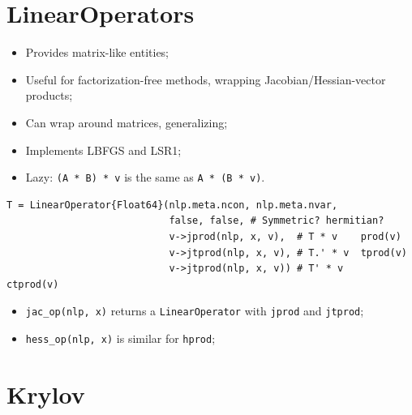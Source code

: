 \section{LinearOperators}

\begin{frame}[fragile,t]
  \begin{itemize}
    \item Provides matrix-like entities;
    \item Useful for factorization-free methods, wrapping Jacobian/Hessian-vector
      products;
    \item Can wrap around matrices, generalizing;
    \item Implements LBFGS and LSR1;
    \item Lazy: \verb+(A * B) * v+ is the same as \verb+A * (B * v)+.
  \end{itemize}
\begin{lstlisting}
T = LinearOperator{Float64}(nlp.meta.ncon, nlp.meta.nvar,
                            false, false, # Symmetric? hermitian?
                            v->jprod(nlp, x, v),  # T * v    prod(v)
                            v->jtprod(nlp, x, v), # T.' * v  tprod(v)
                            v->jtprod(nlp, x, v)) # T' * v    ctprod(v)
\end{lstlisting}
\end{frame}

\begin{frame}[fragile,t]
  \begin{itemize}
    \item \verb+jac_op(nlp, x)+ returns a \verb+LinearOperator+ with \verb+jprod+ and
      \verb+jtprod+;
    \item \verb+hess_op(nlp, x)+ is similar for \verb+hprod+;
  \end{itemize}
\end{frame}

\section{Krylov}

